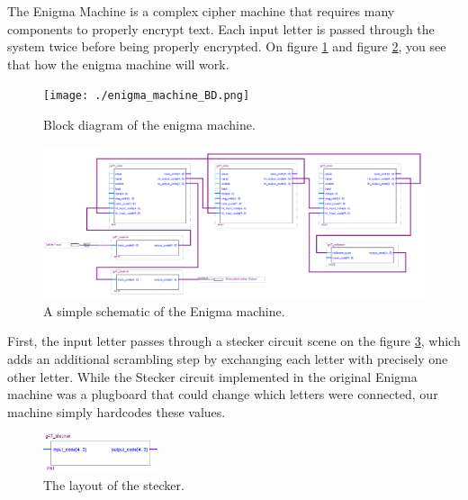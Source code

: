 \documentclass[10pt]{article}
\begin{document}
The Enigma Machine is a complex cipher machine that requires many components to properly encrypt text. Each input letter is passed through the system twice before being properly encrypted. On figure \ref{fig:enigma_machine_BD} and figure \ref{fig:Enigma_machine_sch}, you see that how the enigma machine will work.\\
\begin{figure}[!htb]
    \centering
    \texttt{[image: ./enigma\_machine\_BD.png]}
    \caption{Block diagram of the enigma machine.}
    \label{fig:enigma_machine_BD}
\end{figure}
\begin{figure}[!htb]
    \centering
    \includegraphics[width=1\textwidth]{./Enigma_machine_sch.png}
    \caption{A simple schematic of the Enigma machine.}
    \label{fig:Enigma_machine_sch}
\end{figure}
\newline
First, the input letter passes through a stecker circuit scene on the figure \ref{fig:stecker_layout}, which adds an additional scrambling step by exchanging each letter with precisely one other letter. While the Stecker circuit implemented in the original Enigma machine was a plugboard that could change which letters were connected, our machine simply hardcodes these values.\\
\begin{figure}[!htb]
    \centering
    \includegraphics[width=0.3\textwidth]{./stecker_layout.png}
    \caption{The layout of the stecker.}
    \label{fig:stecker_layout}
\end{figure}
\end{document}
